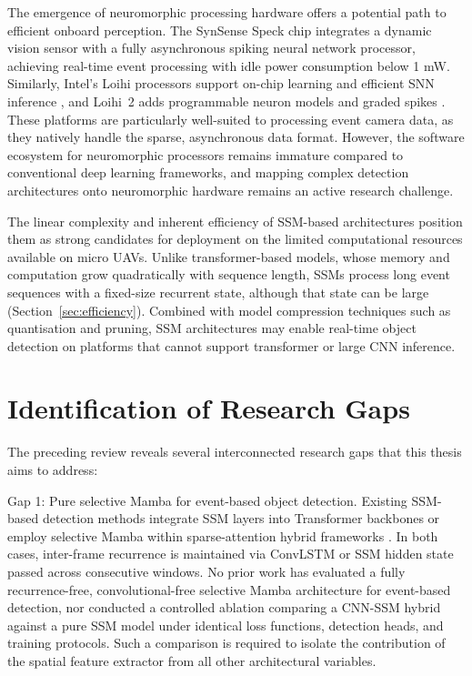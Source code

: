 \documentclass[11pt, a4paper]{report}
\begin{document}
The emergence of neuromorphic processing hardware offers a potential path to efficient onboard perception. The SynSense Speck chip \cite{synsense2026speck} integrates a dynamic vision sensor with a fully asynchronous spiking neural network processor, achieving real-time event processing with idle power consumption below 1 mW. Similarly, Intel's Loihi processors support on-chip learning and efficient SNN inference \cite{davies2021advancing}, and Loihi~2 adds programmable neuron models and graded spikes \cite{orchard2021efficient}. These platforms are particularly well-suited to processing event camera data, as they natively handle the sparse, asynchronous data format. However, the software ecosystem for neuromorphic processors remains immature compared to conventional deep learning frameworks, and mapping complex detection architectures onto neuromorphic hardware remains an active research challenge. 

The linear complexity and inherent efficiency of SSM-based architectures position them as strong candidates for deployment on the limited computational resources available on micro UAVs. Unlike transformer-based models, whose memory and computation grow quadratically with sequence length, SSMs process long event sequences with a fixed-size recurrent state, although that state can be large (Section~\ref{sec:efficiency}). Combined with model compression techniques such as quantisation and pruning, SSM architectures may enable real-time object detection on platforms that cannot support transformer or large CNN inference. 

\section{Identification of Research Gaps}
\label{sec:gaps_thesisA}
The preceding review reveals several interconnected research gaps that this thesis aims to address: 

Gap 1: Pure selective Mamba for event-based object detection. Existing SSM-based detection methods integrate SSM layers into Transformer backbones \cite{zubic2024state} or employ selective Mamba within sparse-attention hybrid frameworks \cite{yang2025smamba}. In both cases, inter-frame recurrence is maintained via ConvLSTM or SSM hidden state passed across consecutive windows. No prior work has evaluated a fully recurrence-free, convolutional-free selective Mamba architecture for event-based detection, nor conducted a controlled ablation comparing a CNN-SSM hybrid against a pure SSM model under identical loss functions, detection heads, and training protocols. Such a comparison is required to isolate the contribution of the spatial feature extractor from all other architectural variables. 
\end{document}

